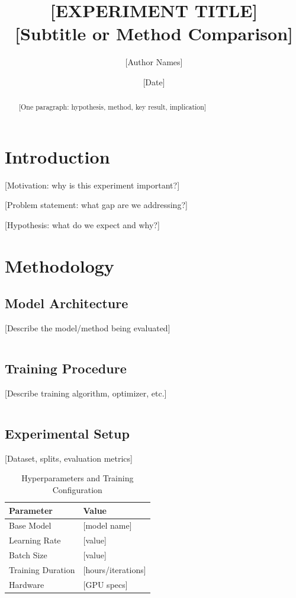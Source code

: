 \documentclass[11pt,a4paper]{article}
\title{[EXPERIMENT TITLE]\\
\large [Subtitle or Method Comparison]}
\author{[Author Names]}
\date{[Date]}
\begin{document}
\maketitle

\begin{abstract}
[One paragraph: hypothesis, method, key result, implication]
\end{abstract}

\section{Introduction}
[Motivation: why is this experiment important?]

[Problem statement: what gap are we addressing?]

[Hypothesis: what do we expect and why?]

\section{Methodology}

\subsection{Model Architecture}
[Describe the model/method being evaluated]

\begin{equation}
[Key equation 1: model formulation]
\label{eq:model}
\end{equation}

\subsection{Training Procedure}
[Describe training algorithm, optimizer, etc.]

\begin{equation}
[Key equation 2: loss or objective]
\label{eq:objective}
\end{equation}

\subsection{Experimental Setup}
[Dataset, splits, evaluation metrics]

\begin{table}[h]
\centering
\caption{Hyperparameters and Training Configuration}
\label{tab:hyperparameters}
\begin{tabular}{ll}
\toprule
Parameter & Value \\
\midrule
Base Model & [model name] \\
Learning Rate & [value] \\
Batch Size & [value] \\
Training Duration & [hours/iterations] \\
Hardware & [GPU specs] \\
\bottomrule
\end{tabular}
\end{table}
\end{document}
